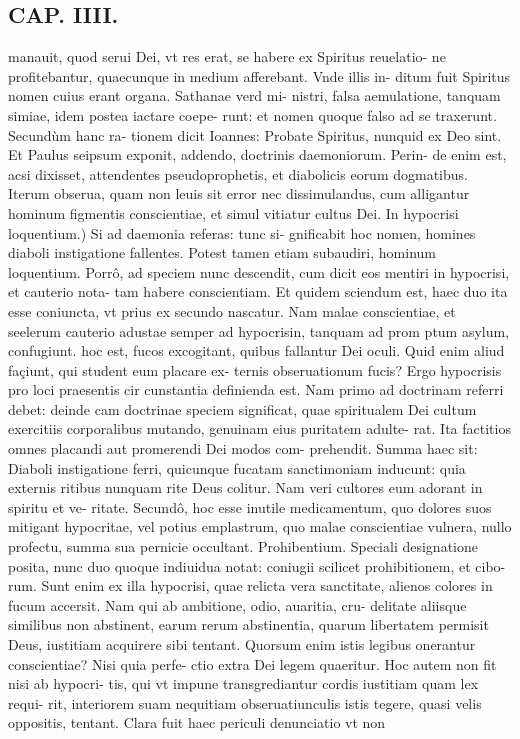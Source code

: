 \documentclass{article}
\begin{document}
\begin{pages}
\section*{CAP. IIII. }
\marginpar{[ p.45 ]}\pstart manauit, quod serui Dei, vt res erat, se habere ex Spiritus reuelatio- ne profitebantur, quaecunque in medium afferebant. Vnde illis in- ditum fuit Spiritus nomen cuius erant organa. Sathanae verd mi- nistri, falsa aemulatione, tanquam simiae, idem postea iactare coepe- runt: et nomen quoque falso ad se traxerunt. Secundùm hanc ra- tionem dicit Ioannes: Probate Spiritus, nunquid ex Deo sint. Et Paulus seipsum exponit, addendo, doctrinis daemoniorum. Perin- de enim est, acsi dixisset, attendentes pseudoprophetis, et diabolicis eorum dogmatibus. Iterum obserua, quam non leuis sit error nec dissimulandus, cum alligantur hominum figmentis conscientiae, et simul vitiatur cultus Dei.  \pend\pstart In hypocrisi loquentium.) Si ad daemonia referas: tunc si- gnificabit hoc nomen, homines diaboli instigatione fallentes. Potest tamen etiam subaudiri, hominum loquentium. Porrô, ad speciem nunc descendit, cum dicit eos mentiri in hypocrisi, et cauterio nota- tam habere conscientiam. Et quidem sciendum est, haec duo ita esse coniuncta, vt prius ex secundo nascatur. Nam malae conscientiae, et seelerum cauterio adustae semper ad hypocrisin, tanquam ad prom ptum asylum, confugiunt. hoc est, fucos excogitant, quibus fallantur Dei oculi. Quid enim aliud façiunt, qui student eum placare ex- ternis obseruationum fucis? Ergo hypocrisis pro loci praesentis cir cunstantia definienda est. Nam primo ad doctrinam referri debet: deinde cam doctrinae speciem significat, quae spiritualem Dei cultum exercitiis corporalibus mutando, genuinam eius puritatem adulte- rat. Ita factitios omnes placandi aut promerendi Dei modos com- prehendit. Summa haec sit: Diaboli instigatione ferri, quicunque fucatam sanctimoniam inducunt: quia externis ritibus nunquam rite Deus colitur. Nam veri cultores eum adorant in spiritu et ve- ritate. Secundô, hoc esse inutile medicamentum, quo dolores suos mitigant hypocritae, vel potius emplastrum, quo malae conscientiae vulnera, nullo profectu, summa sua pernicie occultant.  \pend\pstart Prohibentium. Speciali designatione posita, nunc duo quoque indiuidua notat: coniugii scilicet prohibitionem, et cibo- rum. Sunt enim ex illa hypocrisi, quae relicta vera sanctitate, alienos colores in fucum accersit. Nam qui ab ambitione, odio, auaritia, cru- delitate aliisque similibus non abstinent, earum rerum abstinentia, quarum libertatem permisit Deus, iustitiam acquirere sibi tentant. Quorsum enim istis legibus onerantur conscientiae? Nisi quia perfe- ctio extra Dei legem quaeritur. Hoc autem non fit nisi ab hypocri- tis, qui vt impune transgrediantur cordis iustitiam quam lex requi- rit, interiorem suam nequitiam obseruatiunculis istis tegere, quasi velis oppositis, tentant. Clara fuit haec periculi denunciatio vt non  \pend

\end{pages}
\end{document}
